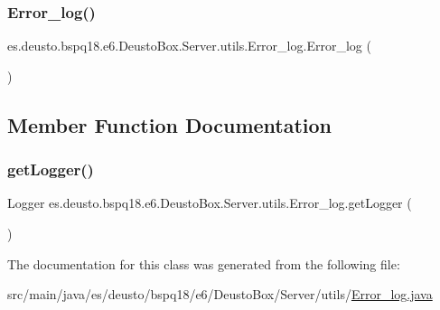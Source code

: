 \subsubsection{\texorpdfstring{Error\+\_\+log()}{Error\_log()}}
{\footnotesize\ttfamily es.\+deusto.\+bspq18.\+e6.\+Deusto\+Box.\+Server.\+utils.\+Error\+\_\+log.\+Error\+\_\+log (\begin{DoxyParamCaption}{ }\end{DoxyParamCaption})}



\subsection{Member Function Documentation}
\mbox{\label{classes_1_1deusto_1_1bspq18_1_1e6_1_1_deusto_box_1_1_server_1_1utils_1_1_error__log_a57a986e69bdc09c9927984eb2816976b}} 
\subsubsection{\texorpdfstring{get\+Logger()}{getLogger()}}
{\footnotesize\ttfamily Logger es.\+deusto.\+bspq18.\+e6.\+Deusto\+Box.\+Server.\+utils.\+Error\+\_\+log.\+get\+Logger (\begin{DoxyParamCaption}{ }\end{DoxyParamCaption})}



The documentation for this class was generated from the following file\+:\begin{DoxyCompactItemize}
\item 
src/main/java/es/deusto/bspq18/e6/\+Deusto\+Box/\+Server/utils/\mbox{\hyperlink{_error__log_8java}{Error\+\_\+log.\+java}}\end{DoxyCompactItemize}
